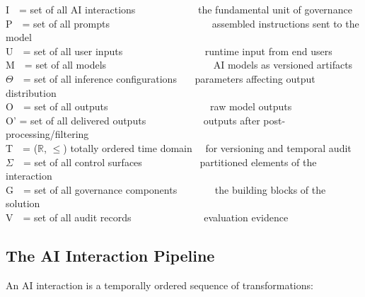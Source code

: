 \begin{cladnote}\footnotesize
I~~= set of all AI interactions~~~~~~~~~~~~\textemdash{} the fundamental unit of governance\\
P~~= set of all prompts~~~~~~~~~~~~~~~~~~~~\textemdash{} assembled instructions sent to the model\\
U~~= set of all user inputs~~~~~~~~~~~~~~~~\textemdash{} runtime input from end users\\
M~~= set of all models~~~~~~~~~~~~~~~~~~~~~\textemdash{} AI models as versioned artifacts\\
$\Theta$~~= set of all inference configurations~~~\textemdash{} parameters affecting output distribution\\
O~~= set of all outputs~~~~~~~~~~~~~~~~~~~~\textemdash{} raw model outputs\\
O' = set of all delivered outputs~~~~~~~~~~~\textemdash{} outputs after post-processing/filtering\\
T~~= ($\mathbb{R}$, $\leq$) \textemdash{} totally ordered time domain~~\textemdash{} for versioning and temporal audit\\
$\Sigma$~~= set of all control surfaces~~~~~~~~~~~\textemdash{} partitioned elements of the interaction\\
G~~= set of all governance components~~~~~~~\textemdash{} the building blocks of the solution\\
V~~= set of all audit records~~~~~~~~~~~~~~\textemdash{} evaluation evidence
\end{cladnote}


\subsection{The AI Interaction Pipeline}


An AI interaction is a temporally ordered sequence of transformations:

